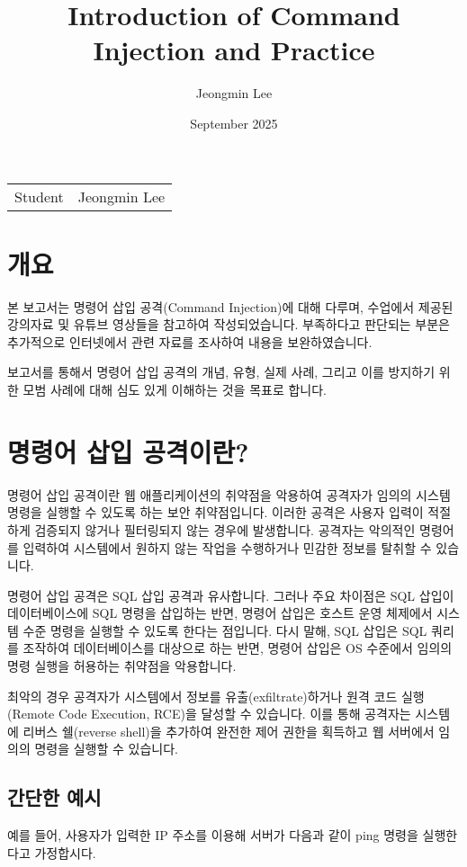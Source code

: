 \documentclass{article}
\title{Introduction of Command Injection and Practice}
\author{Jeongmin Lee}
\date{September 2025}
\begin{document}
\maketitle

\noindent\begin{tabular}{@{}ll}
  Student & Jeongmin Lee\\
\end{tabular}

\section*{개요}
본 보고서는 명령어 삽입 공격(Command Injection)에 대해 다루며, 수업에서 제공된 강의자료 및 유튜브 영상들을 참고하여 작성되었습니다.
부족하다고 판단되는 부분은 추가적으로 인터넷에서 관련 자료를 조사하여 내용을 보완하였습니다. 

보고서를 통해서 명령어 삽입 공격의 개념, 유형, 실제 사례, 그리고 이를 방지하기 위한 모범 사례에 대해 심도 있게 이해하는 것을 목표로 합니다.

\section*{명령어 삽입 공격이란?}
명령어 삽입 공격이란 웹 애플리케이션의 취약점을 악용하여 공격자가 임의의 시스템 명령을 실행할 수 있도록 하는 보안 취약점입니다.
이러한 공격은 사용자 입력이 적절하게 검증되지 않거나 필터링되지 않는 경우에 발생합니다. 
공격자는 악의적인 명령어를 입력하여 시스템에서 원하지 않는 작업을 수행하거나 민감한 정보를 탈취할 수 있습니다.

명령어 삽입 공격은 SQL 삽입 공격과 유사합니다. 그러나 주요 차이점은 SQL 삽입이 데이터베이스에 SQL 명령을 삽입하는 반면, 
명령어 삽입은 호스트 운영 체제에서 시스템 수준 명령을 실행할 수 있도록 한다는 점입니다. 
다시 말해, SQL 삽입은 SQL 쿼리를 조작하여 데이터베이스를 대상으로 하는 반면, 명령어 삽입은 OS 수준에서 임의의 명령 실행을 허용하는 취약점을 악용합니다.

최악의 경우 공격자가 시스템에서 정보를 유출(exfiltrate)하거나 원격 코드 실행(Remote Code Execution, RCE)을 달성할 수 있습니다.
이를 통해 공격자는 시스템에 리버스 쉘(reverse shell)을 추가하여 완전한 제어 권한을 획득하고 웹 서버에서 임의의 명령을 실행할 수 있습니다.

\subsection*{간단한 예시}

예를 들어, 사용자가 입력한 IP 주소를 이용해 서버가 다음과 같이 ping 명령을 실행한다고 가정합시다.
\end{document}
